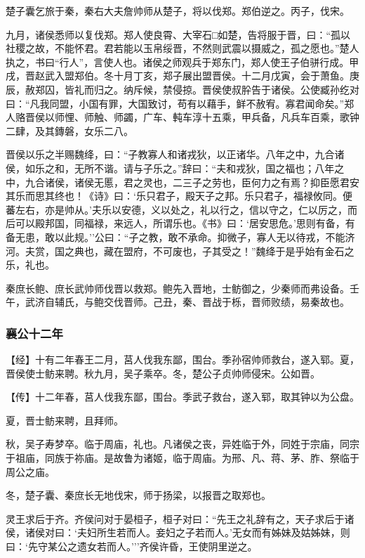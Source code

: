 \documentclass[]{article}
\begin{document}
楚子囊乞旅于秦，秦右大夫詹帅师从楚子，将以伐郑。郑伯逆之。丙子，伐宋。

九月，诸侯悉师以复伐郑。郑人使良霄、大宰石□如楚，告将服于晋，曰：``孤以社稷之故，不能怀君。君若能以玉帛绥晋，不然则武震以摄威之，孤之愿也。''楚人执之，书曰``行人''，言使人也。诸侯之师观兵于郑东门，郑人使王子伯骈行成。甲戌，晋赵武入盟郑伯。冬十月丁亥，郑子展出盟晋侯。十二月戊寅，会于萧鱼。庚辰，赦郑囚，皆礼而归之。纳斥候，禁侵掠。晋侯使叔肸告于诸侯。公使臧孙纥对曰：``凡我同盟，小国有罪，大国致讨，苟有以藉手，鲜不赦宥。寡君闻命矣。''郑人赂晋侯以师悝、师触、师蠲，广车、軘车淳十五乘，甲兵备，凡兵车百乘，歌钟二肆，及其鏄磐，女乐二八。

晋侯以乐之半赐魏绛，曰：``子教寡人和诸戎狄，以正诸华。八年之中，九合诸侯，如乐之和，无所不谐。请与子乐之。''辞曰：``夫和戎狄，国之福也；八年之中，九合诸侯，诸侯无慝，君之灵也，二三子之劳也，臣何力之有焉？抑臣愿君安其乐而思其终也！《诗》曰：`乐只君子，殿天子之邦。乐只君子，福禄攸同。便蕃左右，亦是帅从。'夫乐以安德，义以处之，礼以行之，信以守之，仁以厉之，而后可以殿邦国，同福禄，来远人，所谓乐也。《书》曰：`居安思危。'思则有备，有备无患，敢以此规。''公曰：``子之教，敢不承命。抑微子，寡人无以待戎，不能济河。夫赏，国之典也，藏在盟府，不可废也，子其受之！''魏绛于是乎始有金石之乐，礼也。

秦庶长鲍、庶长武帅师伐晋以救郑。鲍先入晋地，士鲂御之，少秦师而弗设备。壬午，武济自辅氏，与鲍交伐晋师。己丑，秦、晋战于栎，晋师败绩，易秦故也。

\hypertarget{header-n1965}{%
\subsubsection{襄公十二年}\label{header-n1965}}

【经】十有二年春王二月，莒人伐我东鄙，围台。季孙宿帅师救台，遂入郓。夏，晋侯使士鲂来聘。秋九月，吴子乘卒。冬，楚公子贞帅师侵宋。公如晋。

【传】十二年春，莒人伐我东鄙，围台。季武子救台，遂入郓，取其钟以为公盘。

夏，晋士鲂来聘，且拜师。

秋，吴子寿梦卒。临于周庙，礼也。凡诸侯之丧，异姓临于外，同姓于宗庙，同宗于祖庙，同族于祢庙。是故鲁为诸姬，临于周庙。为邢、凡、蒋、茅、胙、祭临于周公之庙。

冬，楚子囊、秦庶长无地伐宋，师于扬梁，以报晋之取郑也。

灵王求后于齐。齐侯问对于晏桓子，桓子对曰：``先王之礼辞有之，天子求后于诸侯，诸侯对曰：`夫妇所生若而人。妾妇之子若而人。'无女而有姊妹及姑姊妹，则曰：`先守某公之遗女若而人。'''齐侯许昏，王使阴里逆之。
\end{document}
